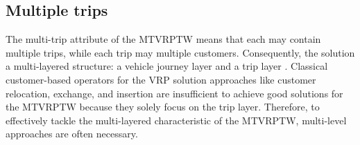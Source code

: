 \subsection{Multiple trips}
The multi-trip attribute of the MTVRPTW means that each  may contain multiple trips, while each trip may  multiple customers.  Consequently, the solution  a multi-layered structure: a vehicle journey layer and a trip layer \citep{wang2014metaheuristic}.  Classical customer-based operators for the VRP solution approaches like customer relocation, exchange, and insertion are insufficient to achieve good solutions for the MTVRPTW because they solely focus on the trip layer.  Therefore, to effectively tackle the multi-layered characteristic of the MTVRPTW, multi-level approaches are often necessary.  
\newline

